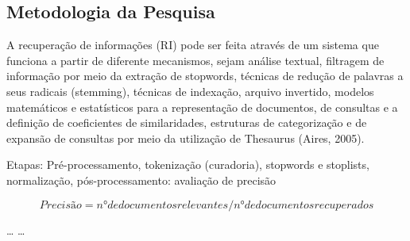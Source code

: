 \documentclass[
]{article}
\begin{document}
\hypertarget{metodologia-da-pesquisa}{%
\subsection{Metodologia da Pesquisa}\label{metodologia-da-pesquisa}}

A recuperação de informações (RI) pode ser feita através de um sistema
que funciona a partir de diferente mecanismos, sejam análise textual,
filtragem de informação por meio da extração de stopwords, técnicas de
redução de palavras a seus radicais (stemming), técnicas de indexação,
arquivo invertido, modelos matemáticos e estatísticos para a
representação de documentos, de consultas e a definição de coeficientes
de similaridades, estruturas de categorização e de expansão de consultas
por meio da utilização de Thesaurus (Aires, 2005).

Etapas: Pré-processamento, tokenização (curadoria), stopwords e
stoplists, normalização, pós-processamento: avaliação de precisão

\[
Precisão = n° de documentos relevantes/n° de documentos recuperados
\]

\ldots{} \ldots{}
\end{document}
